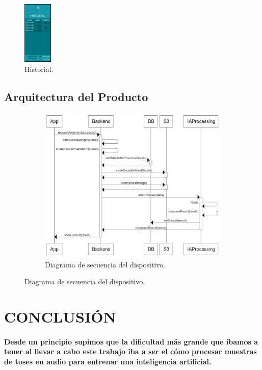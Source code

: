 \documentclass[a4paper,11pt,twocolumn]{article}
\begin{document}
\begin{figure}[H]
\centering
\includegraphics[height=3cm]{figma06}
\caption{Historial.}
\end{figure}
\subsection{Arquitectura del Producto}
\begin{figure}[H]
\begin{subfigure}[b]{1\columnwidth}
\includegraphics[width=\textwidth]{diagrama_de_secuencia}
\caption{Diagrama de secuencia del dispositivo.}
\end{subfigure}
\end{figure}
\section{CONCLUSIÓN}
\paragraph{Desde un principio supimos que la dificultad más grande que íbamos a tener al llevar a cabo este trabajo iba a ser el cómo procesar muestras de toses en audio para entrenar una inteligencia artificial.}
\end{document}
